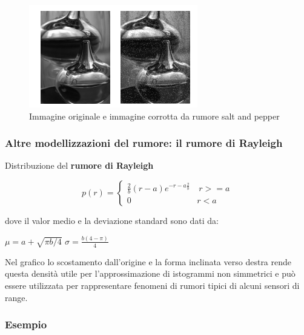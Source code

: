 \begin{figure}[H]
    \centering
    \includegraphics[width=\linewidth, keepaspectratio]{capitoli/immagini/imgs/esempio-salt-pepper.png}
    \caption*{Immagine originale e immagine corrotta da rumore salt and pepper}
\end{figure}

\subsubsection{Altre modellizzazioni del rumore: il rumore di Rayleigh}
Distribuzione del \textbf{rumore di Rayleigh}
\begin{center}
    $$
        p(r) = \left\{ \begin{array}{cl}
            \frac{2}{b}(r-a)e^{-{r-a}\frac{2}{b}} & \ r >= a \\
            0                                     & r<a
        \end{array} \right.
    $$
\end{center}

dove il valor medio e la deviazione standard sono dati da:

\begin{center}
    $\mu = a + \sqrt{\pi b/4}$ $\sigma = \frac{b(4-\pi)}{4}$
\end{center}

Nel grafico lo scostamento dall'origine e la forma inclinata verso
destra rende questa densità utile per l'approssimazione di
istogrammi non simmetrici e può essere utilizzata per rappresentare
fenomeni di rumori tipici di alcuni sensori di range.

\subsubsection{Esempio}

